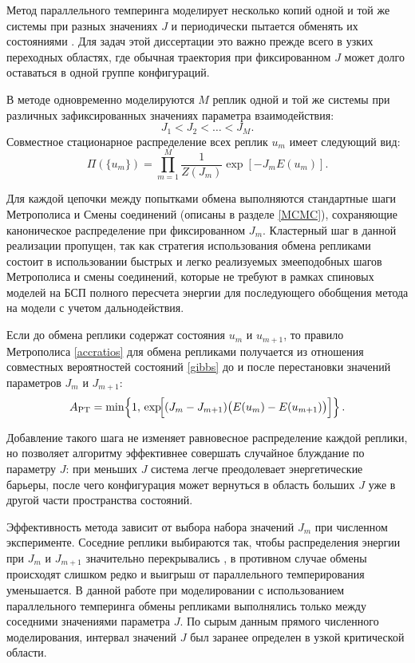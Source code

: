 Метод параллельного темперинга моделирует несколько копий одной и той же системы при разных значениях $J$ и периодически пытается обменять их состояниями \cite{PhysRevLett.57.2607}. 
Для задач этой диссертации это важно прежде всего в узких переходных областях, где обычная траектория при фиксированном $J$ может долго оставаться в одной группе конфигураций.

В методе одновременно моделируются $M$ реплик одной и той же системы при различных зафиксированных значениях параметра взаимодействия:
\[
J_1 < J_2 < \dots < J_M .
\]
Совместное стационарное распределение всех реплик ${u_m}$ имеет следующий вид:
\begin{equation}
	\Pi(\{u_m\})=
	\prod_{m=1}^{M}\frac{1}{Z(J_m)}\exp\!\left[-J_m E(u_m)\right].
\end{equation} 

Для каждой  цепочки между попытками обмена выполняются стандартные шаги    Метрополиса и Смены соединений (описаны в разделе \ref{MCMC}), сохраняющие каноническое распределение при фиксированном $J_m$. Кластерный шаг в данной реализации пропущен, так как стратегия использования обмена репликами состоит в использовании быстрых и легко реализуемых змееподобных шагов Метрополиса и смены соединений, которые не требуют в рамках спиновых моделей на БСП полного пересчета энергии для последующего обобщения метода на модели с учетом дальнодействия. 

Если до обмена реплики содержат состояния $u_m$ и $u_{m+1}$,  то правило Метрополиса  \eqref{accratios}  для обмена репликами получается из отношения совместных вероятностей состояний  \eqref{gibbs}  до и после перестановки значений параметров $J_m$ и $J_{m+1}$:
\begin{equation}
	A_{\mathrm{PT}}=
	\min\!\left\{
	1,\,
	\exp\!\Bigl[(J_m-J_{m+1})
	\bigl(E(u_m)-E(u_{m+1})\bigr)\Bigr]
	\right\}.
	\label{eq:pt_swap}
\end{equation}
 
Добавление такого шага не изменяет равновесное распределение каждой реплики, но позволяет алгоритму эффективнее совершать случайное блуждание по параметру $J$: при меньших $J$ система легче преодолевает энергетические барьеры, после чего конфигурация может вернуться в область больших $J$ уже в другой части  пространства состояний. 

 Эффективность метода зависит от выбора набора значений $J_m$ при численном эксперименте. Соседние реплики выбираются так, чтобы распределения энергии при $J_m$ и $J_{m+1}$  значительно перекрывались   \cite{Katzgraber_2006, PhysRevLett.101.130603, 10.1063/1.1917749}, в противном случае обмены происходят слишком редко и выигрыш от параллельного темперирования уменьшается. 
 В данной работе при моделировании с использованием параллельного темперинга  обмены репликами выполнялись только между соседними значениями параметра $J$. По сырым данным прямого численного моделирования, интервал значений $J$ был заранее определен в узкой критической области. 

